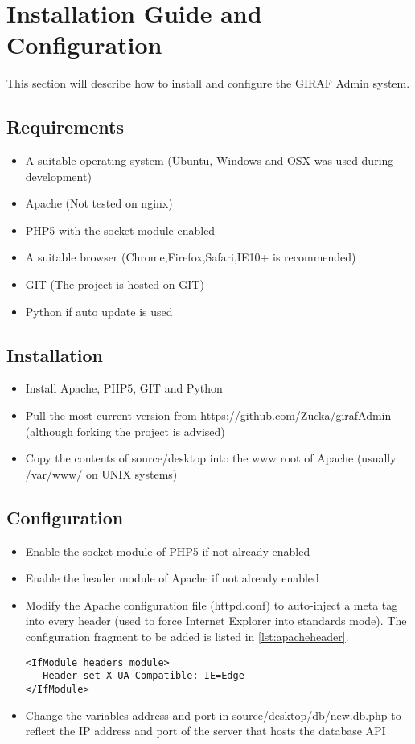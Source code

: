 \chapter{Installation Guide and Configuration}
\label{chap:installGuide}
This section will describe how to install and configure the GIRAF Admin system. 
\section{Requirements}
\begin{itemize}
\item A suitable operating system (Ubuntu, Windows and OSX was used during development)
\item Apache (Not tested on nginx)
\item PHP5 with the socket module enabled
\item A suitable browser (Chrome,Firefox,Safari,IE10+ is recommended)
\item GIT (The project is hosted on GIT)
\item Python if auto update is used
\end{itemize}
\section{Installation}
\begin{itemize}
\item Install Apache, PHP5, GIT and Python
\item Pull the most current version from https://github.com/Zucka/girafAdmin (although forking the project is advised)
\item Copy the contents of source/desktop into the www root of Apache (usually /var/www/ on UNIX systems)
\end{itemize}
\section{Configuration}
\begin{itemize}
\item Enable the socket module of PHP5 if not already enabled
\item Enable the header module of Apache if not already enabled
\item Modify the Apache configuration file (httpd.conf) to auto-inject a meta tag into every header (used to force Internet Explorer into standards mode). The configuration fragment to be added is listed in \autoref{lst:apacheheader}. 
\vspace{-5mm}
\begin{lstlisting}[firstline=1,caption={The configuration fragment to add to httpd.conf},label=lst:apacheheader]
<IfModule headers_module>
   Header set X-UA-Compatible: IE=Edge
</IfModule>
\end{lstlisting}
\vspace{-2mm}
\item Change the variables address and port in source/desktop/db/new.db.php to reflect the IP address and port of the server that hosts the database API
\end{itemize}
